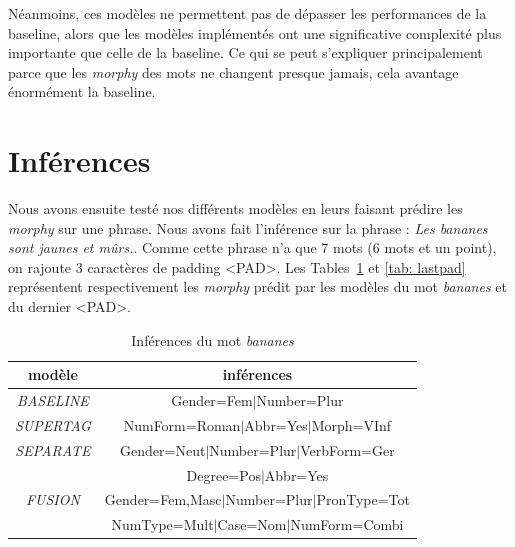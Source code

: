 \documentclass[a4paper]{article}
\begin{document}
Néanmoins, ces modèles ne permettent pas de dépasser les performances de la baseline, alors que les modèles implémentés ont une
significative complexité plus importante que celle de la baseline.
Ce qui se peut s'expliquer principalement parce que les \textit{morphy} des mots ne changent presque jamais, cela avantage 
énormément la baseline.

\section{Inférences}

Nous avons ensuite testé nos différents modèles en leurs faisant prédire les \textit{morphy} sur une phrase. Nous avons fait
l'inférence sur la phrase : \textit{Les bananes sont jaunes et mûrs.}. Comme cette phrase n'a que 7 mots (6 mots et un point),
on rajoute 3 caractères de padding <PAD>. Les Tables~\ref{tab: bananes} et \ref{tab: lastpad} représentent respectivement les
\textit{morphy} prédit par les modèles du mot \textit{bananes} et du dernier <PAD>.
\begin{table}[H]
    \centering
    \begin{tabular}{|c|c|}
        \hline
        \textbf{modèle} & \textbf{inférences} \\
        \hline
        \textit{BASELINE} & Gender=Fem$\mid$Number=Plur \\
        \hline
        \textit{SUPERTAG} & NumForm=Roman$\mid$Abbr=Yes$\mid$Morph=VInf\\
        \hline
        \textit{SEPARATE} & Gender=Neut$\mid$Number=Plur$\mid$VerbForm=Ger\\
            & Degree=Pos$\mid$Abbr=Yes\\
        \hline
        \textit{FUSION} & Gender=Fem,Masc$\mid$Number=Plur$\mid$PronType=Tot\\
            & NumType=Mult$\mid$Case=Nom$\mid$NumForm=Combi\\
        \hline
    \end{tabular}
    \caption{Inférences du mot \textit{bananes}}
    \label{tab: bananes}
\end{table}
\end{document}

